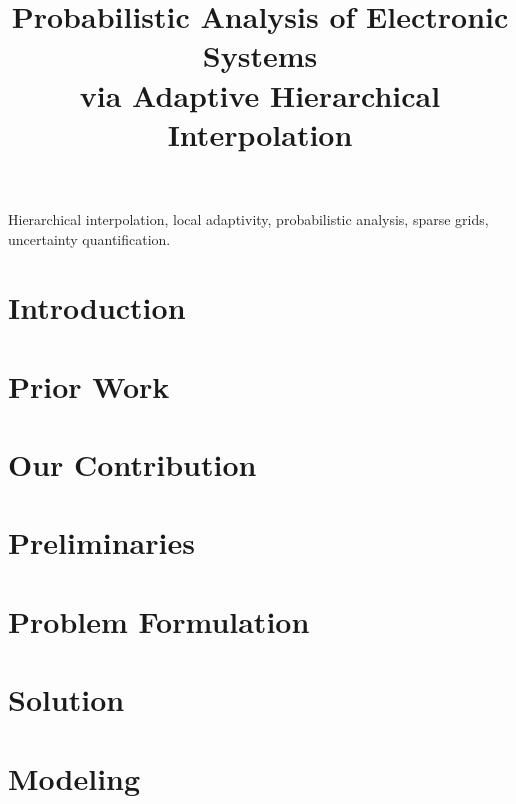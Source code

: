 \documentclass[journal]{IEEEtran}
\title{
  Probabilistic Analysis of Electronic Systems\\
  via Adaptive Hierarchical Interpolation
}
\author{}
\begin{document}
  \maketitle

  \begin{abstract}
    
  \end{abstract}

  \begin{IEEEkeywords}
    Hierarchical interpolation,
    local adaptivity,
    probabilistic analysis,
    sparse grids,
    uncertainty quantification.
  \end{IEEEkeywords}


  \section{Introduction} 
  

  \section{Prior Work} 
  

  \section{Our Contribution} 
  

  \section{Preliminaries} 
  

  \section{Problem Formulation} 
  

  \section{Solution} 
  

  \section{Modeling} 
  
\end{document}
